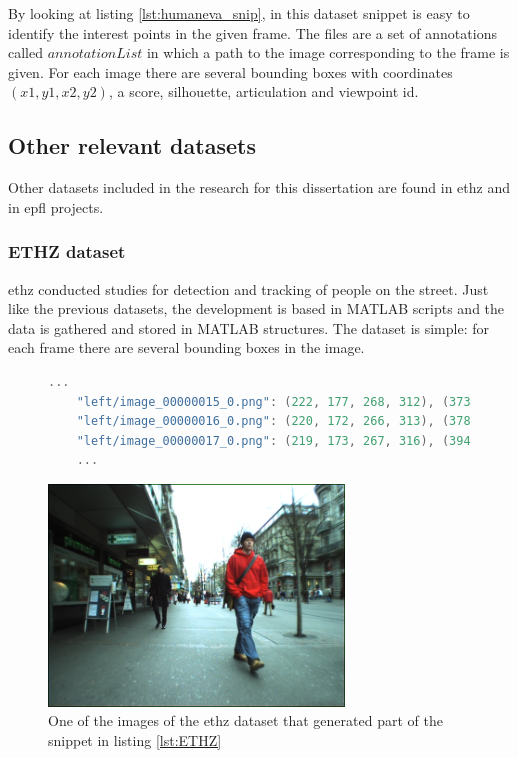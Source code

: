 By looking at listing \ref{lst:humaneva_snip}, in this dataset snippet is easy to identify the interest points in the given frame. The files are a set of annotations called $annotationList$ in which a path to the image corresponding to the frame is given. For each image there are several bounding boxes with coordinates $(x1,y1,x2,y2)$, a score, silhouette, articulation and viewpoint id.

\subsection{Other relevant datasets}
Other datasets included in the research for this dissertation are found in \gls{ethz} and in \gls{epfl} projects. 
\subsubsection{ETHZ dataset}
\gls{ethz} conducted studies for detection and tracking of people on the street. Just like the previous datasets, the development is based in MATLAB scripts and the data is gathered and stored in MATLAB structures. The dataset is simple: for each frame there are several bounding boxes in the image.
\begin{figure}
\begin{center}
	\begin{lstlisting}[label={lst:ETHZ}, caption={ETHZ dataset dataset file snippet.},language=c++]
	...
	"left/image_00000015_0.png": (222, 177, 268, 312), (373, 105, 463, 393), (458, 220, 487, 285), (310, 225, 327, 265), (335, 228, 352, 264), (267, 228, 281, 261);
	"left/image_00000016_0.png": (220, 172, 266, 313), (378, 407, 476, 102), (462, 219, 486, 285), (312, 223, 327, 264), (337, 226, 352, 262), (267, 231, 279, 260);
	"left/image_00000017_0.png": (219, 173, 267, 316), (394, 94, 489, 423), (313, 222, 330, 262), (338, 227, 354, 262), (267, 228, 279, 260);
	...	\end{lstlisting}
\end{center}
\end{figure}

\begin{figure}[htp]
	
	\centering
	\includegraphics[width=0.7\textwidth]{capstate/imgs/image_00000016_0.png}
	
	\caption{One of the images of the \gls{ethz} dataset that generated part of the snippet in listing \ref{lst:ETHZ} }
	\label{fig:ETHZ}
	
\end{figure}

